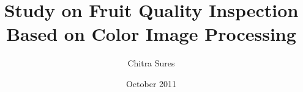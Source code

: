 
\clearpage%

\title{Study on Fruit Quality Inspection Based on Color Image Processing}
\author{Chitra Sures}

\date{October 2011}



\maketitle

